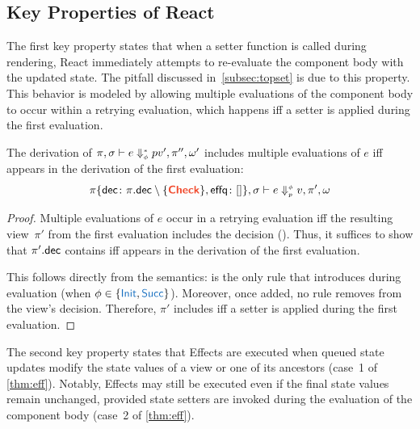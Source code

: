 \subsection{Key Properties of React}\label{subsec:key}
The first key property states that when a setter function is called during rendering, React immediately attempts to re-evaluate the component body with the updated state.
The pitfall discussed in~\cref{subsec:topset} is due to this property.
This behavior is modeled by allowing multiple evaluations of the component body to occur within a retrying evaluation, which happens iff a setter is applied during the first evaluation.

\begin{thm}\label{thm:reeval}
The derivation of \(\Step*[\pi, \sigma]{e}{v', \pi'', \omega'}\) includes multiple evaluations of \(e\)
iff  appears in the derivation of the first evaluation:
\[ \Step[\pi\{\fv{dec}{\pi.\field{dec} \setminus \{\dec{Check}\}}, \fv{effq}{[]}\}, \sigma]{e}{v, \pi', \omega} \]
\end{thm}

\begin{proof}
Multiple evaluations of \(e\) occur in a retrying evaluation iff the resulting view~\(\pi'\) from the first evaluation includes the  decision ().
Thus, it suffices to show that \(\pi'.\textup{\textsf{dec}}\) contains  iff  appears in the derivation of the first evaluation.

This follows directly from the semantics:  is the only rule that introduces  during evaluation (when \(\phi \in \{\phase{Init}, \phase{Succ}\}\)).
Moreover, once added, no rule removes  from the view's decision.
Therefore, \(\pi'\) includes  iff a setter is applied during the first evaluation.
\end{proof}

The second key property states that Effects are executed when queued state updates modify the state values of a view or one of its ancestors (case~1 of \cref{thm:eff}).
Notably, Effects may still be executed even if the final state values remain unchanged, provided state setters are invoked during the evaluation of the component body (case~2 of \cref{thm:eff}).

